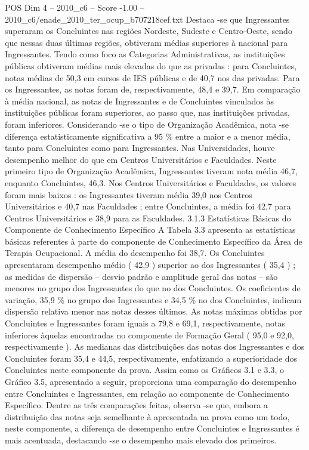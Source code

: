 \begin{textsample}{POS Dim 4 – 2010\_c6 – Score -1.00 – 2010\_c6/enade\_2010\_ter\_ocup\_b707218cef.txt}
Destaca -se que Ingressantes superaram os Concluintes nas regiões Nordeste, Sudeste e Centro-Oeste, sendo que nessas duas últimas regiões, obtiveram médias superiores à nacional para Ingressantes.
Tendo como foco as Categorias Administrativas, as instituições públicas obtiveram médias mais elevadas do que as privadas : para Concluintes, notas médias de 50,3 em cursos de IES públicas e de 40,7 nos das privadas.
Para os Ingressantes, as notas foram de, respectivamente, 48,4 e 39,7.
Em comparação à média nacional, as notas de Ingressantes e de Concluintes vinculados às instituições públicas foram superiores, ao passo que, nas instituições privadas, foram inferiores.
Considerando -se o tipo de Organização Acadêmica, nota -se diferença estatisticamente significativa a 95 \% entre a maior e a menor média, tanto para Concluintes como para Ingressantes.
Nas Universidades, houve desempenho melhor do que em Centros Universitários e Faculdades.
Neste primeiro tipo de Organização Acadêmica, Ingressantes tiveram nota média 46,7, enquanto Concluintes, 46,3.
Nos Centros Universitários e Faculdades, os valores foram mais baixos : os Ingressantes tiveram média 39,0 nos Centros Universitários e 40,7 nas Faculdades ; entre Concluintes, a média foi 42,7 para Centros Universitários e 38,9 para as Faculdades. 3.1.3 Estatísticas Básicas do Componente de Conhecimento Específico A Tabela 3.3 apresenta as estatísticas básicas referentes à parte do componente de Conhecimento Específico da Área de Terapia Ocupacional.
A média do desempenho foi 38,7.
Os Concluintes apresentaram desempenho médio ( 42,9 ) superior ao dos Ingressantes ( 35,4 ) ; as medidas de dispersão – desvio padrão e amplitude geral das notas – são menores no grupo dos Ingressantes do que no dos Concluintes.
Os coeficientes de variação, 35,9 \% no grupo dos Ingressantes e 34,5 \% no dos Concluintes, indicam dispersão relativa menor nas notas desses últimos.
As notas máximas obtidas por Concluintes e Ingressantes foram iguais a 79,8 e 69,1, respectivamente, notas inferiores àquelas encontradas no componente de Formação Geral ( 95,0 e 92,0, respectivamente ).
As medianas das distribuições das notas dos Ingressantes e dos Concluintes foram 35,4 e 44,5, respectivamente, enfatizando a superioridade dos Concluintes neste componente da prova.
Assim como os Gráficos 3.1 e 3.3, o Gráfico 3.5, apresentado a seguir, proporciona uma comparação do desempenho entre Concluintes e Ingressantes, em relação ao componente de Conhecimento Específico.
Dentre as três comparações feitas, observa -se que, embora a distribuição das notas seja semelhante à apresentada na prova como um todo, neste componente, a diferença de desempenho entre Concluintes e Ingressantes é mais acentuada, destacando -se o desempenho mais elevado dos primeiros.

\end{textsample}
